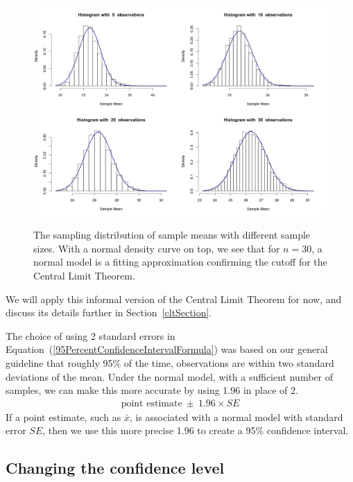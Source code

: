 \begin{figure}[hht] 
   \centering
   \includegraphics[width=\textwidth]{ch_inference_foundations_oi_biostat/figures/netTimeBigSamplingDistribution/clt_30.png}
     \label{cltThirty}
   \caption{The sampling distribution of sample means with different sample sizes. With a normal density curve on top, we see that for $n=30$, a normal model is a fitting approximation confirming the cutoff for the Central Limit Theorem.}
\end{figure}

We will apply this informal version of the Central Limit Theorem for now, and discuss its details further in Section~\ref{cltSection}.

The choice of using 2 standard errors in Equation~(\ref{95PercentConfidenceIntervalFormula}) was based on our general guideline that roughly 95\% of the time, observations are within two standard deviations of the mean. Under the normal model, with a sufficient number of samples, we can make this more accurate by using 1.96 in place of  2.
\begin{eqnarray}
\text{point estimate}\ \pm\ 1.96\times SE
\label{95PercentCIWhenUsingNormalModel}
\end{eqnarray}
If a point estimate, such as $\bar{x}$, is associated with a normal model with standard error $SE$, then we use this more precise 1.96 to create a  95\% confidence interval. 

\subsection{Changing the confidence level}
\label{changingTheConfidenceLevelSection}

